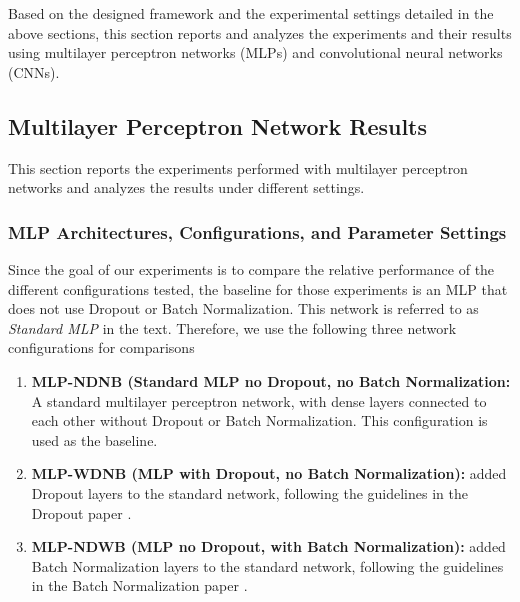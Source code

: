 \documentclass[../dropout-vs-batch-normalization.tex]{subfiles}
\begin{document}
Based on the designed framework and the experimental settings detailed in the above sections, this section reports and analyzes the experiments and their results using multilayer perceptron networks (MLPs) and convolutional neural networks (CNNs).

\subsection{Multilayer Perceptron Network Results}

This section reports the experiments performed with multilayer perceptron networks and analyzes the results under different settings. %

\medskip
\subsubsection{MLP Architectures, Configurations, and Parameter Settings}

Since the goal of our experiments is to compare the relative performance of the different configurations tested, the baseline for those experiments is an MLP that does not use Dropout or Batch Normalization. This network is referred to as \textit{Standard MLP} in the text. Therefore, we use the following three network configurations for comparisons





\begin{enumerate}
\item \textbf{MLP-NDNB (Standard MLP no Dropout, no Batch Normalization:} A standard multilayer perceptron network, with dense layers connected to each other without Dropout or Batch Normalization. This configuration is used as the baseline.
\item \textbf{MLP-WDNB (MLP with Dropout, no Batch Normalization):} added Dropout layers to the standard network, following the guidelines in the Dropout paper \cite{Srivastava2014}.
\item \textbf{MLP-NDWB (MLP no Dropout, with Batch Normalization):} added Batch Normalization layers to the standard network, following the guidelines in the Batch Normalization paper \cite{Ioffe2015}.
\end{enumerate}
\end{document}
